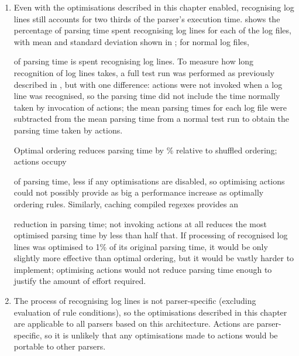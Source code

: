 \begin{enumerate}

    \item Even with the optimisations described in this chapter enabled,
        recognising log lines still accounts for two thirds of the parser's
        execution time.   shows the percentage of parsing time
        spent recognising log lines for each of the \numberOFlogFILES{} log
        files, with mean and standard deviation shown in
        ; for normal log files,
        
        of parsing time is spent recognising log lines.  To measure how
        long recognition of log lines takes, a full test run was performed
        as previously described in , but with
        one difference: actions were not invoked when a log line was
        recognised, so the parsing time did not include the time normally
        taken by invocation of actions; the mean parsing times for each log
        file were subtracted from the mean parsing time from a normal test
        run to obtain the parsing time taken by actions.

        Optimal ordering reduces parsing time by
        \%
        relative to shuffled ordering; actions occupy
        
        of parsing time, less if any optimisations are disabled, so
        optimising actions could not possibly provide as big a performance
        increase as optimally ordering rules.  Similarly, caching compiled
        regexes provides an
        
        reduction in parsing time; not invoking actions at all reduces the
        most optimised parsing time by less than half that.  If processing
        of recognised log lines was optimised to 1\% of its original
        parsing time, it would be only slightly more effective than optimal
        ordering, but it would be vastly harder to implement; optimising
        actions would not reduce parsing time enough to justify the amount
        of effort required.

    \item The process of recognising log lines is not parser-specific
        (excluding evaluation of rule conditions), so the optimisations
        described in this chapter are applicable to all parsers based on
        this architecture.  Actions are parser-specific, so it is unlikely
        that any optimisations made to actions would be portable to other
        parsers.

\end{enumerate}

